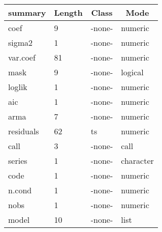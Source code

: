 \begin{table}[!tbp]
\begin{center}
\begin{tabular}{llll}
\hline\hline
\multicolumn{1}{l}{summary}&\multicolumn{1}{c}{Length}&\multicolumn{1}{c}{Class}&\multicolumn{1}{c}{Mode}\tabularnewline
\hline
coef& 9&-none-&numeric\tabularnewline
sigma2& 1&-none-&numeric\tabularnewline
var.coef&81&-none-&numeric\tabularnewline
mask& 9&-none-&logical\tabularnewline
loglik& 1&-none-&numeric\tabularnewline
aic& 1&-none-&numeric\tabularnewline
arma& 7&-none-&numeric\tabularnewline
residuals&62&ts&numeric\tabularnewline
call& 3&-none-&call\tabularnewline
series& 1&-none-&character\tabularnewline
code& 1&-none-&numeric\tabularnewline
n.cond& 1&-none-&numeric\tabularnewline
nobs& 1&-none-&numeric\tabularnewline
model&10&-none-&list\tabularnewline
\hline
\end{tabular}\end{center}

\end{table}
